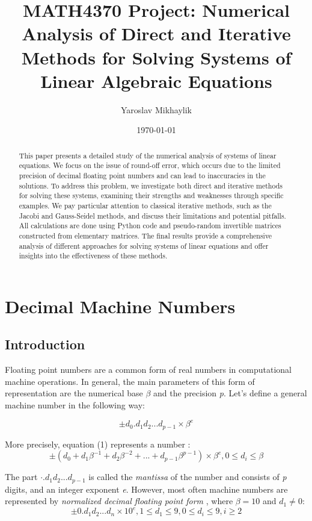 \documentclass[letterpaper,12pt]{article}
\title{MATH4370 Project: Numerical Analysis of Direct and Iterative Methods for Solving Systems of Linear Algebraic Equations}
\author{Yaroslav Mikhaylik}
\date{\today}
\begin{document}
\maketitle
\begin{abstract}
    This paper presents a detailed study of the numerical analysis of systems of linear equations. We focus on the issue of round-off error, which occurs due to the limited precision of decimal floating point numbers and can lead to inaccuracies in the solutions. To address this problem, we investigate both direct and iterative methods for solving these systems, examining their strengths and weaknesses through specific examples. We pay particular attention to classical iterative methods, such as the Jacobi and Gauss-Seidel methods, and discuss their limitations and potential pitfalls. All calculations are done using Python code and pseudo-random invertible matrices constructed from elementary matrices. The final results provide a comprehensive analysis of different approaches for solving systems of linear equations and offer insights into the effectiveness of these methods.
\end{abstract}

\section{Decimal Machine Numbers}
\subsection{Introduction}

Floating point numbers are a common form of real numbers in computational machine operations. In general, the main parameters of this form of representation are the numerical base \emph{$\beta$} and the precision \emph{p}. Let's define a general machine number in the following way:

\begin{equation}
    \pm d_0.d_1d_2...d_{p-1} \times \beta^e
\end{equation}

More precisely, equation (1) represents a number \cite{numbers}:
\begin{equation}
    \pm (d_0 + d_1\beta^{-1} + d_2\beta^{-2} + ... + d_{p-1}\beta^{p-1}) \times \beta^e,  0 \le d_i \le \beta
\end{equation}

The part $\cdot.d_1d_2...d_{p-1}$ is called the \emph{mantissa} of the number and consists of \emph{p} digits, and an integer exponent \emph{e}. However, most often machine numbers are represented by \textit{normalized decimal floating point form} \cite{DFPN}, where $\beta = 10$ and $d_{1} \neq 0$:
\begin{equation}
    \pm 0.d_1d_2...d_n \times 10^e, 1 \le d_1 \le 9, 0 \le d_i \le 9,
    i \ge 2
\end{equation}
\end{document}
